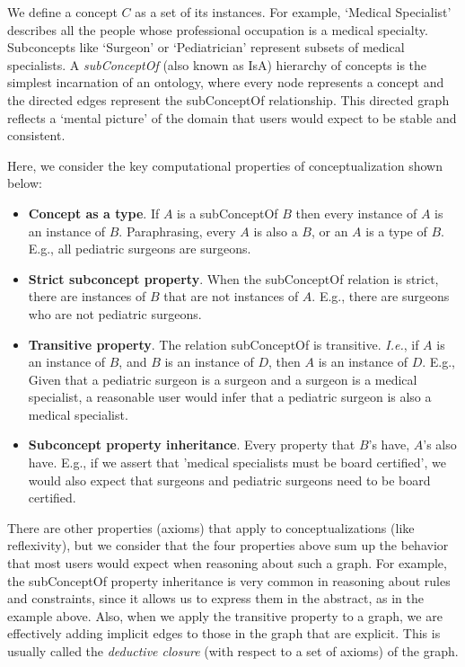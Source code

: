 \documentclass{article} %
\begin{document}
We define a concept $C$ as a set of its instances. For example, `Medical Specialist' describes all the people whose professional occupation is a medical specialty. Subconcepts like `Surgeon' or `Pediatrician' represent subsets of medical specialists. A {\em subConceptOf} (also known as IsA) hierarchy of concepts is the simplest incarnation of an ontology, where every node represents a concept and the directed edges represent the subConceptOf relationship. This directed graph reflects a `mental picture' of the domain that users would expect to be stable and consistent.  

Here, we consider the key computational properties of conceptualization shown below: 

\begin{itemize} \label{concept_properties}
\item {\bf Concept as a type}. If $A$ is a subConceptOf $B$ then every instance of $A$ is an instance of $B$. Paraphrasing, every $A$ is also a $B$, or an $A$ is a type of $B$. E.g., all pediatric surgeons are surgeons. 
\item {\bf Strict subconcept property}. When the subConceptOf relation is strict, there are instances of $B$ that are not instances of $A$. E.g., there are surgeons who are not pediatric surgeons. 
\item {\bf Transitive property}. The relation subConceptOf is transitive. \textit{I.e.}, if $A$ is an instance of $B$, and $B$ is an instance of $D$, then $A$ is an instance of $D$. E.g., Given that a pediatric surgeon is a surgeon and a surgeon is a medical specialist, a reasonable user would infer that a pediatric surgeon is also a medical specialist. 
\item {\bf Subconcept property inheritance}. Every property that $B$'s have, $A$'s also have. E.g., if we assert that 'medical specialists must be board certified', we would also expect that surgeons and pediatric surgeons need to be board certified. 
\end{itemize}

There are other properties (axioms) that apply to conceptualizations (like reflexivity), but we consider that the four properties above sum up the behavior that most users would expect when reasoning about such a graph. For example, the subConceptOf property inheritance is very common in reasoning about rules and constraints, since it allows us to express them in the abstract, as in the example above. Also, when we apply the transitive property to a graph, we are effectively adding implicit edges to those in the graph that are explicit. This is usually called the {\em deductive closure} (with respect to a set of axioms) of the graph.
\end{document}
